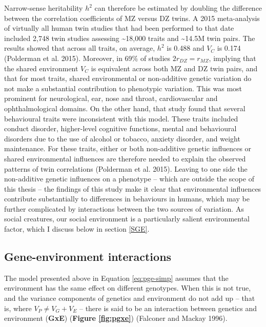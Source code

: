 \documentclass[
]{book}
\begin{document}
Narrow-sense heritability \(h^2\) can therefore be estimated by doubling the difference between the correlation coefficients of MZ versus DZ twins. A 2015 meta-analysis of virtually all human twin studies that had been performed to that date included 2,748 twin studies assessing \textasciitilde18,000 traits and \textasciitilde14.5M twin pairs. The results showed that across all traits, on average, \(h^2\) is 0.488 and \(V_C\) is 0.174 (Polderman et al. 2015). Moreover, in 69\% of studies \(2r_{DZ} = r_{MZ}\), implying that the shared environment \(V_C\) is equivalent across both MZ and DZ twin pairs, and that for most traits, shared environmental or non-additive genetic variation do not make a substantial contribution to phenotypic variation. This was most prominent for neurological, ear, nose and throat, cardiovascular and ophthalmological domains. On the other hand, that study found that several behavioural traits were inconsistent with this model. These traits included conduct disorder, higher-level cognitive functions, mental and behavioural disorders due to the use of alcohol or tobacco, anxiety disorder, and weight maintenance. For these traits, either or both non-additive genetic influences or shared environmental influences are therefore needed to explain the observed patterns of twin correlations (Polderman et al. 2015). Leaving to one side the non-additive genetic influences on a phenotype -- which are outside the scope of this thesis -- the findings of this study make it clear that environmental influences contribute substantially to differences in behaviours in humans, which may be further complicated by interactions between the two sources of variation. As social creatures, our social environment is a particularly salient environmental factor, which I discuss below in section \ref{SGE}.

\hypertarget{gene-environment-interactions}{%
\subsection{Gene-environment interactions}\label{gene-environment-interactions}}

The model presented above in Equation \eqref{eq:pge-simp} assumes that the environment has the same effect on different genotypes. When this is not true, and the variance components of genetics and environment do not add up -- that is, where \(V_{P} \neq V_{G} + V_{E}\) -- there is said to be an interaction between genetics and environment (\textbf{GxE}) (\textbf{Figure \ref{fig:pgxe}}) (Falconer and Mackay 1996).
\end{document}
